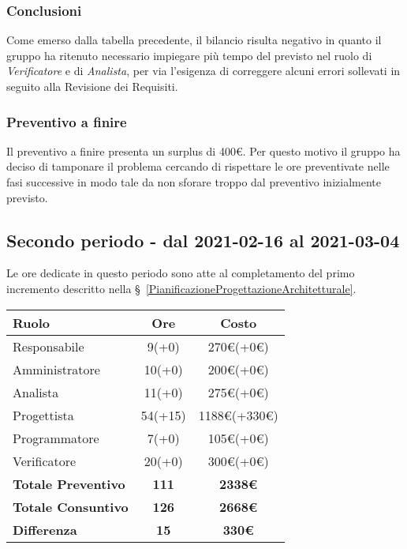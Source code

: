 {{{\subsubsection{Conclusioni}
Come emerso dalla tabella precedente, il bilancio risulta negativo in quanto il gruppo ha ritenuto necessario impiegare più tempo del previsto nel ruolo di \textit{Verificatore} e di \textit{Analista}, per via l'esigenza di correggere alcuni errori sollevati in seguito alla Revisione dei Requisiti.

\subsubsection{Preventivo a finire}
Il preventivo a finire presenta un surplus di 400\euro. Per questo motivo il gruppo ha deciso di tamponare il problema cercando di rispettare le ore preventivate nelle fasi successive in modo tale da non sforare troppo dal preventivo inizialmente previsto.

\subsection{Secondo periodo - dal 2021-02-16 al 2021-03-04 }\label{ConsuntivoPeriodoDiProgettazioneArchitetturaleTechnologyBaselinePrimoIncremento}

Le ore dedicate in questo periodo sono atte al completamento del primo incremento descritto nella  \S~\ref{PianificazioneProgettazioneArchitetturale}.

\quad
\def\tabularxcolumn#1{m{#1}}
{
	\begin{center}
		\renewcommand{\arraystretch}{1.4}
		\begin{tabularx}{10cm}{|X|c|c|}
			\hline
			\rowcolor{airforceblue}
			\textbf{Ruolo} & \textbf{Ore} & \textbf{Costo}\\
			\hline
			Responsabile & 9(+0) & 270\euro(+0\euro)\\
			\hline
			Amministratore & 10(+0) & 200\euro(+0\euro)\\
			\hline
			Analista & 11(+0) & 275\euro(+0\euro)\\
			\hline
			Progettista & 54(+15) & 1188\euro(+330\euro)\\
			\hline
			Programmatore & 7(+0) & 105\euro(+0\euro)\\
			\hline
			Verificatore & 20(+0) & 300\euro(+0\euro)\\
			\hline
			\textbf{Totale Preventivo} & \textbf{111} & \textbf{2338\euro}\\
			\hline
			\textbf{Totale Consuntivo} & \textbf{126} & \textbf{2668\euro}\\
			\hline
			\textbf{Differenza} & \textbf{15} & \textbf{330\euro}
		\end{tabularx}
	\end{center}

}}}}
